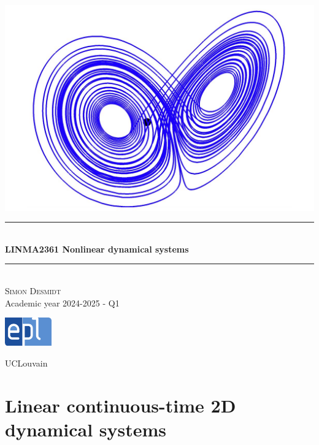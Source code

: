 \documentclass[12pt, openany]{report}
\theoremstyle{definition}
\newcommand{\HRule}{\rule{\linewidth}{0.5mm}}
\begin{document}
\begin{titlepage}
    \begin{sffamily}
    \begin{center}
        \includegraphics[scale=0.25]{img/page_de_garde.png} \\[1cm]
        \HRule \\[0.4cm]
        { \huge \bfseries LINMA2361 Nonlinear dynamical systems \\[0.4cm] }
    
        \HRule \\[1.5cm]
        \textsc{\LARGE Simon Desmidt}\\[1cm]
        \vfill
        \vspace{2cm}
        {\large Academic year 2024-2025 - Q1}
        \vspace{0.4cm}
         
        \includegraphics[width=0.15\textwidth]{img/epl.png}
        
        UCLouvain\\
    
    \end{center}
    \end{sffamily}
\end{titlepage}

\setcounter{tocdepth}{1}
\tableofcontents
\chapter{Linear continuous-time 2D dynamical systems}
\end{document}

